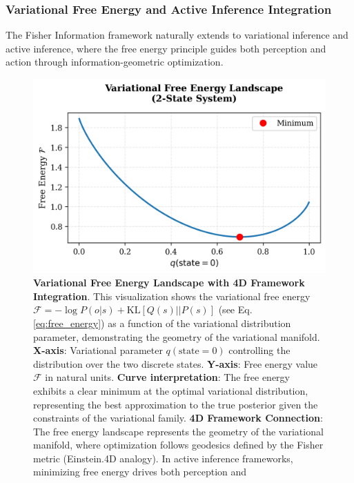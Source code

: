 \documentclass[
  10pt,
]{article}
\begin{document}
\hypertarget{variational-free-energy-and-active-inference-integration}{%
\subsubsection{Variational Free Energy and Active Inference
Integration}\label{variational-free-energy-and-active-inference-integration}}

The Fisher Information framework naturally extends to variational
inference and active inference, where the free energy principle guides
both perception and action through information-geometric optimization.

\begin{figure}
\centering
\includegraphics{../output/figures/free_energy_curve.png}
\caption{\textbf{Variational Free Energy Landscape with 4D Framework
Integration}. This visualization shows the variational free energy
\(\mathcal{F} = -\log P(o|s) + \text{KL}[Q(s)||P(s)]\) (see Eq.
\eqref{eq:free_energy}) as a function of the variational distribution
parameter, demonstrating the geometry of the variational manifold.
\textbf{X-axis}: Variational parameter \(q(\text{state}=0)\) controlling
the distribution over the two discrete states. \textbf{Y-axis}: Free
energy value \(\mathcal{F}\) in natural units. \textbf{Curve
interpretation}: The free energy exhibits a clear minimum at the optimal
variational distribution, representing the best approximation to the
true posterior given the constraints of the variational family.
\textbf{4D Framework Connection}: The free energy landscape represents
the geometry of the variational manifold, where optimization follows
geodesics defined by the Fisher metric (Einstein.4D analogy). In active
inference frameworks, minimizing free energy drives both perception and
}
\end{figure}
\end{document}

